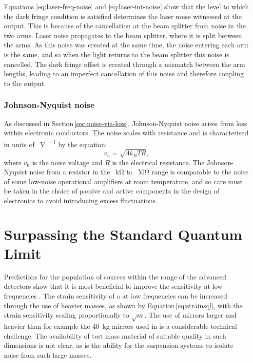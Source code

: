 Equations \ref{eq:laser-freq-noise} and \ref{eq:laser-int-noise} show that the level to which the dark fringe condition is satisfied determines the laser noise witnessed at the output. This is because of the cancellation at the beam splitter from noise in the two arms. Laser noise propagates to the beam splitter, where it is split between the arms. As this noise was created at the same time, the noise entering each arm is the same, and so when the light returns to the beam splitter this noise is cancelled. The dark fringe offset is created through a mismatch between the arm lengths, leading to an imperfect cancellation of this noise and therefore coupling to the output.

\subsubsection{\label{sec:johnson-nyquist-noise}Johnson-Nyquist noise}
As discussed in Section\,\ref{sec:noise-via-loss}, Johnson-Nyquist noise arises from loss within electronic conductors. The noise scales with resistance and is characterised in units of \SI{}{\volt\per\sqrthz} by the equation:
\begin{equation}
  v_{\text{n}} = \sqrt{4 k_B T R},
\end{equation}
where $v_{\text{n}}$ is the noise voltage and $R$ is the electrical resistance. The Johnson-Nyquist noise from a resistor in the \SI{}{\kilo\ohm} to \SI{}{\mega\ohm} range is comparable to the noise of some low-noise operational amplifiers at room temperature, and so care must be taken in the choice of passive and active components in the design of electronics to avoid introducing excess fluctuations.

\section{\label{sec:sub-sql-techniques}Surpassing the Standard Quantum Limit}
Predictions for the population of sources within the range of the advanced detectors show that it is most beneficial to improve the sensitivity at low frequencies . The strain sensitivity of a \MI{} at low frequencies can be increased through the use of heavier masses, as shown by Equation\,\ref{eq:strainsql}, with the strain sensitivity scaling proportionally to $\sqrt{m}$. The use of mirrors larger and heavier than for example the \SI{40}{\kilo\gram} mirrors used in \ALIGO{} is a considerable technical challenge. The availability of test mass material of suitable quality in such dimensions is not clear, as is the ability for the suspension systems to isolate noise from such large masses.

